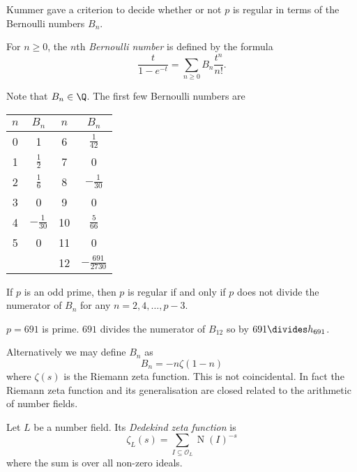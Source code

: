 \documentclass[a4paper]{article}
\renewcommand*{\O}{\mathcal{O}}
\DeclareMathOperator{\n}{N}
\begin{document}
Kummer gave a criterion to decide whether or not \(p\) is regular in terms of the Bernoulli numbers \(B_n\).

\begin{definition}
  For \(n \geq 0\), the \(n\)th \emph{Bernoulli number} is defined by the formula
  \[
    \frac{t}{1 - e^{-t}} = \sum_{n \geq 0} B_n \frac{t^n}{n!}.
  \]
\end{definition}

Note that \(B_n \in \Q\). The first few Bernoulli numbers are
\begin{table}[ht]
  \centering
  \begin{tabular}{|c|c||c|c|}
    \(n\) & \(B_n\) & \(n\) & \(B_n\) \\ \hline
    0 & 1 & 6 & \(\frac{1}{42}\) \\ \hline
    1 & \(\frac{1}{2}\) & 7 & 0 \\ \hline
    2 & \(\frac{1}{6}\) & 8 & \(-\frac{1}{30}\) \\ \hline
    3 & 0 & 9 & 0 \\ \hline
    4 & \(-\frac{1}{30}\) & 10 & \(\frac{5}{66}\) \\ \hline
    5 & 0 & 11 & 0 \\ \hline
          & & 12 & \(- \frac{691}{2730}\) \\
  \end{tabular}
\end{table}

\begin{theorem}
  \label{thm:Kummer's criterion}
  If \(p\) is an odd prime, then \(p\) is regular if and only if \(p\) does not divide the numerator of \(B_n\) for any \(n = 2, 4, \dots, p - 3\).
\end{theorem}

\begin{eg}
  \(p = 691\) is prime. \(691\) divides the numerator of \(B_{12}\) so by  \(691 \divides h_{691}\).
\end{eg}

Alternatively we may define \(B_n\) as
\[
  B_n = -n\zeta(1 - n)
\]
where \(\zeta(s)\) is the Riemann zeta function. This is not coincidental. In fact the Riemann zeta function and its generalisation are closed related to the arithmetic of number fields.

\begin{definition}
  Let \(L\) be a number field. Its \emph{Dedekind zeta function} is
  \[
    \zeta_L(s) = \sum_{I \subseteq \O_L} \n(I)^{-s}
  \]
  where the sum is over all non-zero ideals.
\end{definition}
\end{document}
